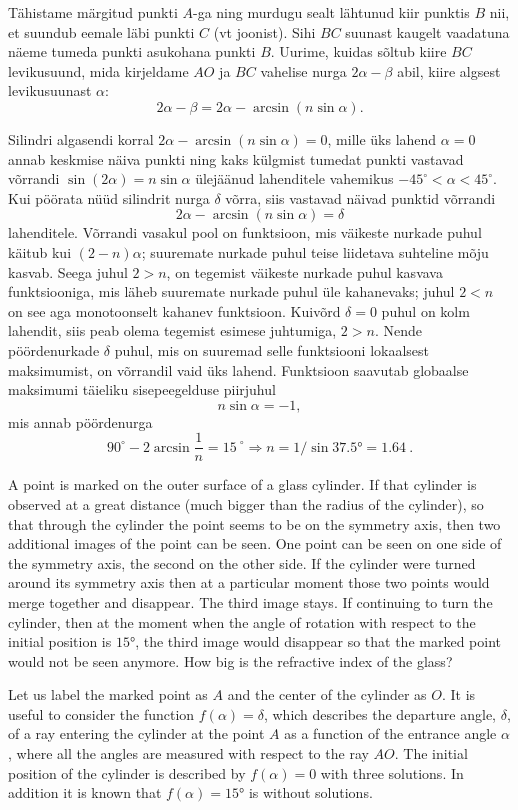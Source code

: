 Tähistame märgitud punkti $A$-ga ning murdugu sealt lähtunud kiir punktis $B$ nii, et suundub eemale läbi punkti $C$ (vt joonist).
Sihi $BC$ suunast kaugelt vaadatuna näeme tumeda punkti asukohana punkti $B$. Uurime, kuidas sõltub kiire $BC$ levikusuund, mida kirjeldame 
$AO$ ja $BC$ vahelise nurga $2\alpha-\beta$ abil, kiire algsest levikusuunast $\alpha$:
$$2\alpha-\beta= 2\alpha-\arcsin (n\sin\alpha).$$

Silindri algasendi korral $2\alpha-\arcsin (n\sin\alpha) =0$, mille üks lahend $\alpha=0$ annab keskmise näiva punkti
ning kaks külgmist tumedat punkti vastavad võrrandi $\sin(2\alpha)=n\sin\alpha$ ülejäänud lahenditele vahemikus $-45^\circ <\alpha<45^\circ$.
Kui pöörata nüüd silindrit nurga $\delta$ võrra, siis vastavad näivad punktid võrrandi 
$$2\alpha-\arcsin (n\sin\alpha) =\delta$$
lahenditele. Võrrandi vasakul pool on funktsioon, mis väikeste nurkade puhul käitub kui $(2-n)\alpha$; suuremate nurkade puhul teise liidetava suhteline mõju kasvab.
Seega juhul $2>n$, on tegemist väikeste nurkade puhul kasvava funktsiooniga, mis läheb suuremate nurkade puhul üle kahanevaks;
juhul $2<n$ on see aga monotoonselt kahanev funktsioon. Kuivõrd $\delta=0$ puhul on kolm lahendit, siis peab olema tegemist esimese juhtumiga, $2>n$.
Nende pöördenurkade $\delta$ puhul, mis on suuremad selle funktsiooni lokaalsest maksimumist, on võrrandil vaid üks lahend.
Funktsioon saavutab globaalse maksimumi täieliku sisepeegelduse piirjuhul 
$$n\sin\alpha=-1,$$
mis annab pöördenurga
$$90^\circ-2\arcsin \frac 1n=\SI{15}{}^\circ\Rightarrow n=1/\sin \ang{37,5} = \SI{1,64}{}.$$

A point is marked on the outer surface of a glass cylinder. If that cylinder is observed at a great distance (much bigger than the radius of the cylinder), so that through the cylinder the point seems to be on the symmetry axis, then two additional images of the point can be seen. One point can be seen on one side of the symmetry axis, the second on the other side. If the cylinder were turned around its symmetry axis then at a particular moment those two points would merge together and disappear. The third image stays. If continuing to turn the cylinder, then at the moment when the angle of rotation with respect to the initial position is $\ang{15}$, the third image would disappear so that the marked point would not be seen anymore. How big is the refractive index of the glass?

\hinteng
Let us label the marked point as $A$ and the center of the cylinder as $O$. It is useful to consider the function $f(\alpha) = \delta$, which describes the departure angle, $\delta$, of a ray entering the cylinder at the point $A$ as a function of the entrance angle $\alpha$, where all the angles are measured with respect to the ray $AO$. The initial position of the cylinder is described by $f(\alpha) = 0$ with three solutions. In addition it is known that $f(\alpha) = \ang{15}$ is without solutions.


